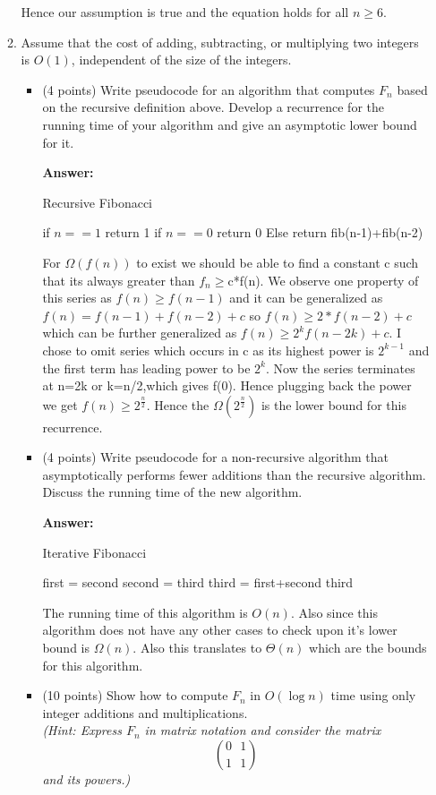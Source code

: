 \documentclass[11pt]{article}
\newcommand{\ans}{\textbf{Answer: }}
\begin{document}
\begin{enumerate}
\begin{enumerate}
Hence our assumption is true and the equation holds for all $n\geq 6$.
\item  Assume that the cost of adding, subtracting, or multiplying two integers is $O(1)$, independent 
of the size of the integers.
\begin{itemize}
\item (4 points) Write pseudocode for an algorithm that computes $F_n$ based on the recursive definition above. 
Develop a recurrence for the running time of your algorithm and 
give an asymptotic lower bound for it.

\ans 
\begin{algorithm}
\caption{Recursive Fibonacci}\label{euclid}
\begin{algorithmic}[1]
\State if $n==1$
\State return 1
\State if $n==0$
\State return 0 
\State Else 
\State return fib(n-1)+fib(n-2)
\EndProcedure
\end{algorithmic}
\end{algorithm}

For $\Omega(f(n))$ to exist we should be able to find a constant c such that its always greater than $f_n \geq$c*f(n). We observe one property of this series as $f(n)\geq f(n-1)$ and it can be generalized as 
$f(n) = f(n-1)+f(n-2) + c$ so $f(n)\geq 2*f(n-2)+c$ which can be further generalized as $f(n)\geq 2^kf(n-2k)+c$. I chose to omit series which occurs in c as its highest power is $2^{k-1}$ and the first term has leading power to be $2^k$. Now the series terminates at n=2k or k=n/2,which gives f(0). Hence plugging back the power we get $f(n)\geq 2^\frac{n}{2}$. Hence the $\Omega(2^\frac{n}{2})$ is the lower bound for this recurrence.
\item (4 points) Write pseudocode for a non-recursive algorithm that asymptotically performs fewer
additions than the recursive algorithm. Discuss the running time of the new algorithm.

\ans 
\begin{algorithm}
\caption{Iterative Fibonacci}\label{euclid}
\begin{algorithmic}[1]
\State first = second
\State second = third
\State third = first+second
\EndFor
\State third
\EndProcedure
\end{algorithmic}
\end{algorithm}
The running time of this algorithm is $O(n)$. Also since this algorithm does not have any other cases to check upon it's lower bound is $\Omega(n)$. Also this translates to $\Theta(n)$ which are the bounds for this algorithm.
\newpage
\item (10 points) Show how to compute $F_n$ in $O(\log{n})$ time 
using only integer additions and multiplications. \\
{\em (Hint: Express $F_n$ in matrix notation
and consider the matrix $${0 \ \ \ 1} \choose {1\ \ \  1} $$
 and its powers.)}


\end{itemize}
\end{enumerate}
\end{enumerate}
\end{document}
